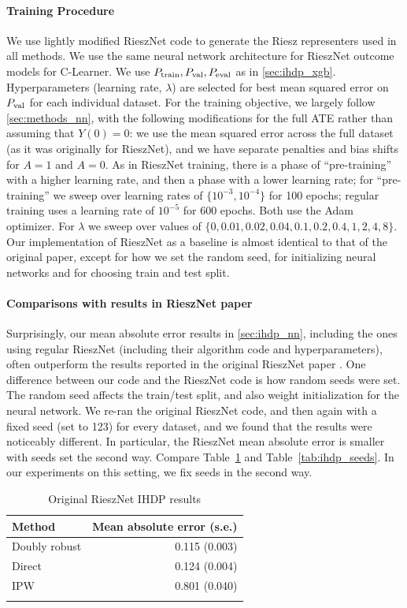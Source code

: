 \paragraph{Training Procedure}
We use lightly modified RieszNet code \citep{chernozhukov2022riesznet} to generate the Riesz representers used in all methods. 
We use the same neural network architecture for RieszNet outcome models for C-Learner. 
We use $P_{\rm train}, P_{\rm val}, P_{\rm eval}$ as in \cref{sec:ihdp_xgb}. 
Hyperparameters (learning rate, $\lambda$) are selected for best mean squared error on $P_{\rm val}$ for each individual dataset. 
For the training objective, we largely follow \cref{sec:methods_nn}, with the following modifications for the full ATE rather than assuming that $Y(0)=0$: we use the mean squared error across the full dataset (as it was originally for RieszNet), and we have separate penalties and bias shifts for $A=1$ and $A=0$. 
As in RieszNet training, there is a phase of ``pre-training'' with a higher learning rate, and then a phase with a lower learning rate; for ``pre-training'' we sweep over learning rates of $\{10^{-3},10^{-4}\}$ for 100 epochs; regular training uses a learning rate of $10^{-5}$ for 600 epochs. Both use the Adam optimizer. For $\lambda$ we sweep over values of 
$\{0,0.01,0.02,0.04,0.1,0.2,0.4,1,2,4,8\}$.
Our implementation of RieszNet as a baseline is almost identical to that of the original paper, except for how we set the random seed, for initializing neural networks and for choosing train and test split. 
    

\paragraph{Comparisons with results in RieszNet paper} 
Surprisingly, our mean absolute error results in \cref{sec:ihdp_nn},
including the ones using regular RieszNet (including their algorithm code and hyperparameters), often outperform the results reported in the original RieszNet paper \citep{chernozhukov2022riesznet}. 
One difference between our code and the RieszNet code is how random seeds were set. The random seed affects the train/test split, and also weight initialization for the neural network. We re-ran the original RieszNet code, and then again with a fixed seed (set to 123) for every dataset, and we found that the results were noticeably different. 
In particular, the RieszNet mean absolute error is smaller with seeds set the second way. 
Compare Table~\ref{tab:ihdp_orig} and Table~\ref{tab:ihdp_seeds}. 
In our experiments on this setting, we fix seeds in the second way. 
\begin{table}[H]
\centering
\footnotesize
\begin{tabular}{lr}
\toprule
Method & Mean absolute error (s.e.) \\
 \midrule 
Doubly robust & 0.115 (0.003) \\
Direct & 0.124 (0.004) \\
IPW & 0.801 (0.040) \\
\bottomrule
\vspace{0.05em}
\end{tabular}
\caption{Original RieszNet IHDP results}
    \label{tab:ihdp_orig}
\end{table}

